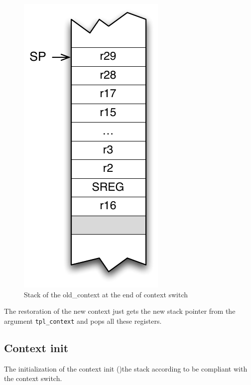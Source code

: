 \begin{figure}[htbp] %
\begin{minipage}{0.4\textwidth}
    \centering
  \includegraphics[scale=.6]{pictures/avr8-stackSave.pdf} 
\end{minipage}
\begin{minipage}{0.6\textwidth}
  \caption{Stack of the old_context at the end of context switch}\label{fig:avr8-stackSave}
\end{minipage}
\end{figure}

The restoration of the new context just gets the new stack pointer from the argument \texttt{tpl_context} and pops all these registers.

\subsection{Context init}
The initialization of the context init ()the stack according to be compliant with the context switch. 



